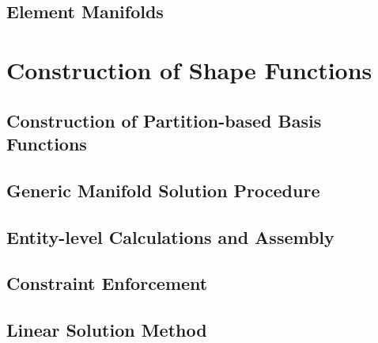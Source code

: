 	\subsection{Element Manifolds}

\section{Construction of Shape Functions}

	\subsection{Construction of Partition-based Basis Functions}

	\subsection{Generic Manifold Solution Procedure}

	\subsection{Entity-level Calculations and Assembly}

	\subsection{Constraint Enforcement}

	\subsection{Linear Solution Method}

